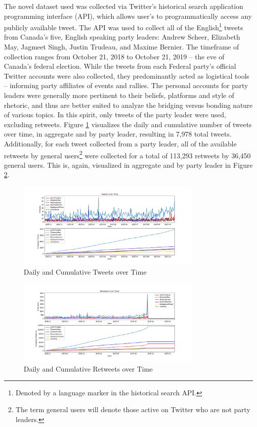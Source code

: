 The novel dataset used was collected via Twitter's historical search application
programming interface (API), which allows user's to programmatically access any
publicly available tweet. The API was used to collect all of the
English\footnote{Denoted by a language marker in the historical search API.}
tweets from Canada's five, English speaking party leaders: Andrew Scheer,
Elizabeth May, Jagmeet Singh, Justin Trudeau, and Maxime Bernier. The timeframe
of collection ranges from October 21, 2018 to October 21, 2019 -- the eve of
Canada’s federal election. While the tweets from each Federal party’s official
Twitter accounts were also collected, they predominantly acted as logistical
tools – informing party affiliates of events and rallies. The personal accounts
for party leaders were generally more pertinent to their beliefs, platforms and
style of rhetoric, and thus are better suited to analyze the bridging versus
bonding nature of various topics. In this spirit, only tweets of the party
leader were used, excluding retweets. Figure \ref{fig:tweets_over_time}
visualizes the daily and cumulative number of tweets over time, in aggregate and
by party leader, resulting in 7,978 total tweets. Additionally, for each tweet collected from a party leader, all of the available
retweets by general users\footnote{The term general users will denote those
active on Twitter who are not party leaders.} were collected for a total of
113,293 retweets by 36,450 general users. This is, again, visualized in
aggregate and by party leader in Figure \ref{fig:retweets_over_time}.

\begin{figure}[h!]
  \centering
  \includegraphics[width=0.8\textwidth]{figures/tweets_over_time}
  \caption[Daily and Cumulative Tweets over Time]{Daily and Cumulative Tweets over Time}
  \label{fig:tweets_over_time}
\end{figure}

\begin{figure}[h!]
  \centering
  \includegraphics[width=0.8\textwidth]{figures/retweets_over_time}
  \caption[Daily and Cumulative Retweets over Time]{Daily and Cumulative Retweets over Time}
  \label{fig:retweets_over_time}
\end{figure}

